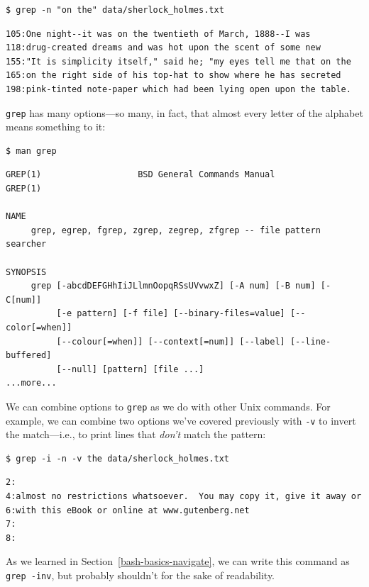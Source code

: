 \documentclass[
]{krantz}
\begin{document}
\begin{verbatim}
$ grep -n "on the" data/sherlock_holmes.txt
\end{verbatim}

\begin{verbatim}
105:One night--it was on the twentieth of March, 1888--I was
118:drug-created dreams and was hot upon the scent of some new
155:"It is simplicity itself," said he; "my eyes tell me that on the
165:on the right side of his top-hat to show where he has secreted
198:pink-tinted note-paper which had been lying open upon the table.
\end{verbatim}

\texttt{grep} has many options---so many,
in fact,
that almost every letter of the alphabet means something to it:

\begin{verbatim}
$ man grep
\end{verbatim}

\begin{verbatim}
GREP(1)                   BSD General Commands Manual                  GREP(1)

NAME
     grep, egrep, fgrep, zgrep, zegrep, zfgrep -- file pattern searcher

SYNOPSIS
     grep [-abcdDEFGHhIiJLlmnOopqRSsUVvwxZ] [-A num] [-B num] [-C[num]]
          [-e pattern] [-f file] [--binary-files=value] [--color[=when]]
          [--colour[=when]] [--context[=num]] [--label] [--line-buffered]
          [--null] [pattern] [file ...]
...more...
\end{verbatim}

We can combine options to \texttt{grep} as we do with other Unix commands.
For example,
we can combine two options we've covered previously with \texttt{-v}
to invert the match---i.e.,
to print lines that \emph{don't} match the pattern:

\begin{verbatim}
$ grep -i -n -v the data/sherlock_holmes.txt
\end{verbatim}

\begin{verbatim}
2:
4:almost no restrictions whatsoever.  You may copy it, give it away or
6:with this eBook or online at www.gutenberg.net
7:
8:
\end{verbatim}

As we learned in Section~\ref{bash-basics-navigate},
we can write this command as \texttt{grep\ -inv},
but probably shouldn't for the sake of readability.
\end{document}
